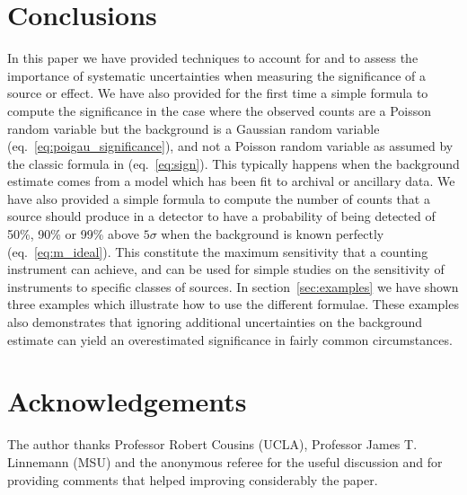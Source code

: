 \documentclass[twocolumn]{aastex61}
\renewcommand{\textbf}{}
\begin{document}
\section{Conclusions}
In this paper we have provided techniques to account for and to assess the importance of systematic uncertainties when measuring the significance of a source or effect. We have also provided for the first time a simple formula to compute the significance in the case where the observed counts are a Poisson random variable but the background is a Gaussian random variable (eq.~\ref{eq:poigau_significance}), and not a Poisson random variable as assumed by the classic formula in \citet{LiMa} (eq.~\ref{eq:sign}). This typically happens when the background estimate comes from a model which has been fit to archival or ancillary data. We have also provided a simple formula to compute the number of counts that a source should produce in a detector to have a probability of being detected of 50\%, 90\% or 99\% above $5\sigma$ when the background is known perfectly (eq.~\ref{eq:m_ideal}). This constitute the maximum sensitivity that a counting instrument can achieve, \textbf{and can be used for simple studies on the sensitivity of instruments to specific classes of sources}. In section~\ref{sec:examples} we have shown three examples which illustrate how to use the different formulae. These examples also demonstrates that ignoring additional uncertainties on the background estimate can yield an overestimated significance in fairly common circumstances.

\section{Acknowledgements}
The author thanks Professor Robert Cousins (UCLA), Professor James T. Linnemann (MSU) and the anonymous referee for the useful discussion and for providing comments that helped improving considerably the paper.
\end{document}
